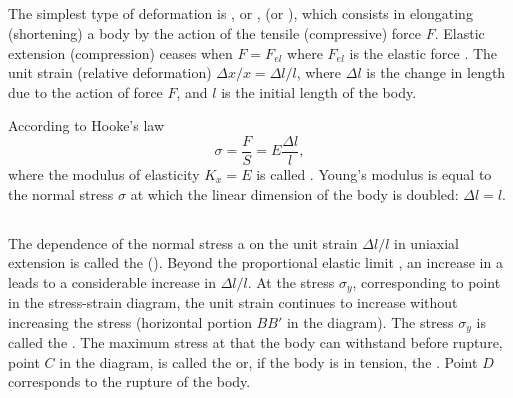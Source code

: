 \subsection{}\label{40.3.6} The simplest type of deformation is , or ,  (or ), which consists in elongating (shortening) a body by the action of the tensile (compressive) force $F$. Elastic extension (compression) ceases when $F = F_{el}$ where $F_{el}$ is the elastic force . The unit strain (relative deformation) $\Delta x/x = \Delta l/l$, where $\Delta l$ is the change in length due to the action of force $F$, and $l$ is the initial length of the body.

According to Hooke's law
\begin{equation*}%
\sigma = \frac{F}{S} = E \frac{\Delta l}{l},
\end{equation*}
where the modulus of elasticity $K_{x} = E$ is called . Young's modulus is equal to the normal stress $\sigma$ at which the linear dimension of the body is doubled: $\Delta l = l$.

\subsection{}\label{40.3.7} The dependence of the
normal stress a on the unit strain $\Delta l/l$ in uniaxial extension is called the 
(). Beyond the proportional elastic limit , an increase in a leads to a considerable increase in $\Delta l/l$. At the stress $\sigma_{y}$, corresponding to point in the stress-strain diagram, the unit
strain continues to increase without increasing the stress (horizontal portion $BB'$ in the diagram). The stress $\sigma_{y}$ is called the . The maximum stress at that the body can withstand before rupture, point $C$ in the diagram, is called the  or, if the body is in tension, the . Point $D$ corresponds to the rupture of the body.

